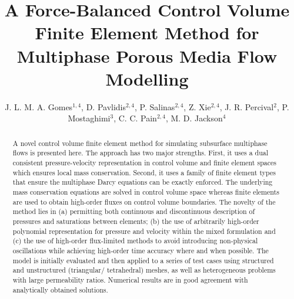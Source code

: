 \documentclass[times]{fldauth}
\begin{document}

\title{A Force-Balanced Control Volume Finite Element Method for Multiphase Porous Media Flow Modelling}

\author{J. L. M. A. Gomes\corrauth$^{1,4}$, D. Pavlidis$^{2,4}$, P. Salinas$^{2,4}$, Z. Xie$^{2,4}$, J. R. Percival$^{2}$, P. Mostaghimi$^{3}$, C. C. Pain$^{2,4}$, M. D. Jackson$^{4}$}

\address{$^{1}$Environmental and Industrial Fluid Mechanics Group, School of Engineering, University of Aberdeen, UK \\
         $^{2}$Applied Modelling and Computation Group, Department of Earth Science and Engineering, Imperial College London, UK \\
         $^{3}$School of Petroleum Engineering, University of New South Wales, Australia \\
         $^{4}$Novel Reservoir Modelling and Simulation Group, Department of Earth Science and Engineering, Imperial College London, UK\\}



\begin{abstract}
  A novel control volume finite element method for simulating subsurface multiphase flows is presented here. The approach has two major strengths. First, it uses a dual consistent pressure-velocity representation in control volume and finite element spaces which ensures local mass conservation. Second, it uses a family of finite element types that ensure the multiphase Darcy equations can be exactly enforced. The underlying mass conservation equations are solved in control volume space whereas finite elements are used to obtain high-order fluxes on control volume boundaries. The novelty of the method lies in (a) permitting both continuous and discontinuous description of pressures and saturations between elements; (b) the use of arbitrarily high-order polynomial representation for pressure and velocity within the mixed formulation and (c) the use of high-order flux-limited methods to avoid introducing non-physical oscillations while achieving high-order time accuracy where and when possible. The model is initially evaluated and then applied to a series of test cases using structured and unstructured (triangular/ tetrahedral) meshes, as well as heterogeneous problems with large permeability ratios. Numerical results are in good agreement with analytically obtained solutions.
\end{abstract}
\end{document}
